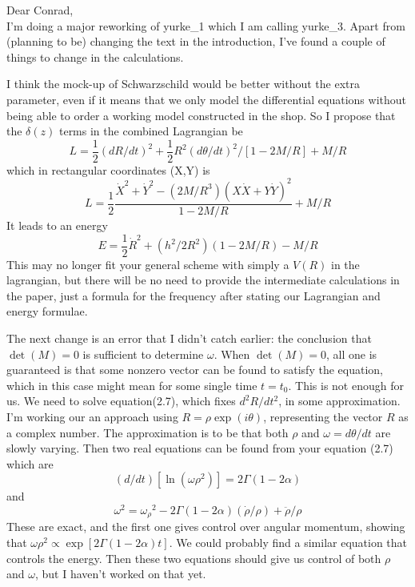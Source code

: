 \def\half{\mbox{$\frac{1}{2}$}}     %



Dear Conrad,\\[1ex]
%
     I'm doing a major reworking of yurke\_1 which I am calling 
yurke\_3.  Apart from (planning to be) changing the text in the 
introduction, I've found a couple of things to change in the 
calculations.

     I think the mock-up of Schwarzschild would be better without 
the extra parameter, even if it means that we only model the 
differential equations without being able to order a working model 
constructed in the shop.  
So I propose that the $\delta(z)$ terms in the combined Lagrangian 
be 
$$
   L = \half (dR/dt)^2 + \half R^2 (d\theta/dt)^2 / [1-2M/R]  + M/R
$$
which in rectangular coordinates (X,Y) is
$$
  L = \half \frac{ \dot{X}^2 + \dot{Y}^2 
                   - (2M/R^3)(X\dot{X}+Y\dot{Y})^2}{1-2M/R}
             +M/R
$$
It leads to an energy 
$$
    E = \half \dot{R}^2 +  (h^2/2 R^2)(1-2M/R) - M/R
$$
This may no longer fit your general scheme with simply a $V(R)$ in 
the lagrangian, but there will be no need to provide the 
intermediate calculations in the paper, just a formula for the 
frequency after stating our Lagrangian and energy formulae.

   The next change is an error that I didn't catch earlier:  
the conclusion that  $\det(M) = 0$ is sufficient to determine 
$\omega$.  
When $\det(M) = 0$, all one is guaranteed is that some nonzero 
vector can be found to satisfy the equation, which in this case 
might mean for some single time $t = t_0$.  
This is not enough for us.  
We need to solve equation(2.7), which fixes $d^2 R/dt^2$, in 
some approximation.  
I'm working our an approach using  $R = \rho \exp(i\theta)$, 
representing the vector $R$ as a complex number.  
The approximation is to be that both $\rho$ and 
$\omega = d\theta /dt$ are slowly varying.  
Then two real equations can be found from your equation (2.7) 
which are
$$
   (d/dt)[\ln(\omega \rho^2)] = 2 \Gamma (1 - 2\alpha)
$$
and 
$$
  \omega^2 = {\omega_\rho}^2 -2\Gamma(1-2\alpha)(\dot{\rho}/\rho)
                             + \ddot{\rho}/\rho
$$
These are exact, and the first one gives control over angular 
momentum, showing that
$\omega \rho^2 \propto \exp[2\Gamma(1-2\alpha)t]$.  
We could probably find a similar equation that controls the energy.  
Then these two equations should give us control of both $\rho$ 
and $\omega$, but I haven't worked on that yet.


